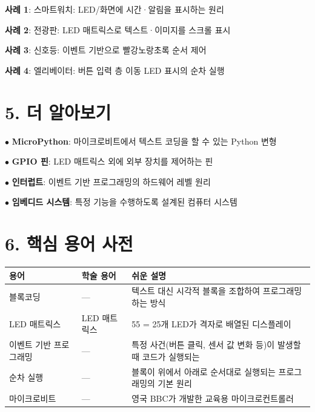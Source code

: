 \documentclass[11pt,a4paper]{article}
\begin{document}
\textbf{사례 1}: 스마트워치: LED/화면에 시간·알림을 표시하는 원리


\textbf{사례 2}: 전광판: LED 매트릭스로 텍스트·이미지를 스크롤 표시


\textbf{사례 3}: 신호등: 이벤트 기반으로 빨강\textrightarrow{}노랑\textrightarrow{}초록 순서 제어


\textbf{사례 4}: 엘리베이터: 버튼 입력 \textrightarrow{} 층 이동 \textrightarrow{} LED 표시의 순차 실행



\section*{5. 더 알아보기}

$\bullet$ \textbf{MicroPython}: 마이크로비트에서 텍스트 코딩을 할 수 있는 Python 변형

$\bullet$ \textbf{GPIO 핀}: LED 매트릭스 외에 외부 장치를 제어하는 핀

$\bullet$ \textbf{인터럽트}: 이벤트 기반 프로그래밍의 하드웨어 레벨 원리

$\bullet$ \textbf{임베디드 시스템}: 특정 기능을 수행하도록 설계된 컴퓨터 시스템



\section*{6. 핵심 용어 사전}

\begin{center}
\renewcommand{\arraystretch}{1.4}
\begin{tabular}{|p{3.3cm}|p{1.8cm}|p{9.8cm}|}
\hline
\rowcolor{tableheader}
\textbf{용어} & \textbf{학술 용어} & \textbf{쉬운 설명} \\
\hline
블록코딩 & — & 텍스트 대신 시각적 블록을 조합하여 프로그래밍하는 방식 \\
\hline
LED 매트릭스 & LED 매트릭스 & 5\texttimes{}5 = 25개 LED가 격자로 배열된 디스플레이 \\
\hline
이벤트 기반 프로그래밍 & — & 특정 사건(버튼 클릭, 센서 값 변화 등)이 발생할 때 코드가 실행되는 \\
\hline
순차 실행 & — & 블록이 위에서 아래로 순서대로 실행되는 프로그래밍의 기본 원리 \\
\hline
마이크로비트 & — & 영국 BBC가 개발한 교육용 마이크로컨트롤러 \\
\hline
\end{tabular}
\end{center}
\end{document}
